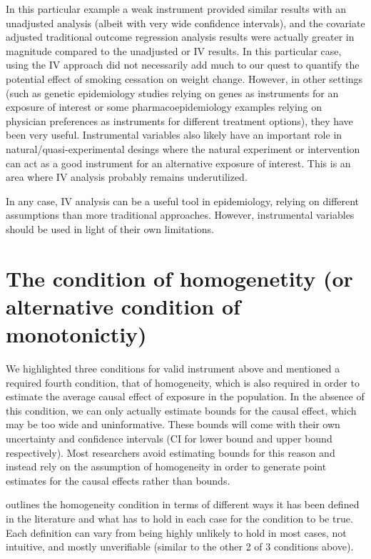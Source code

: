 \documentclass[
]{book}
\begin{document}
In this particular example a weak instrument provided similar results with an unadjusted analysis (albeit with very wide confidence intervals), and the covariate adjusted traditional outcome regression analysis results were actually greater in magnitude compared to the unadjusted or IV results. In this particular case, using the IV approach did not necessarily add much to our quest to quantify the potential effect of smoking cessation on weight change. However, in other settings (such as genetic epidemiology studies relying on genes as instruments for an exposure of interest or some pharmacoepidemiology examples relying on physician preferences as instruments for different treatment options), they have been very useful. Instrumental variables also likely have an important role in natural/quasi-experimental desings where the natural experiment or intervention can act as a good instrument for an alternative exposure of interest. This is an area where IV analysis probably remains underutilized.

In any case, IV analysis can be a useful tool in epidemiology, relying on different assumptions than more traditional approaches. However, instrumental variables should be used in light of their own limitations.

\section{The condition of homogenetity (or alternative condition of monotonictiy)}\label{the-condition-of-homogenetity-or-alternative-condition-of-monotonictiy}

We highlighted three conditions for valid instrument above and mentioned a required fourth condition, that of homogeneity, which is also required in order to estimate the average causal effect of exposure in the population. In the absence of this condition, we can only actually estimate bounds for the causal effect, which may be too wide and uninformative. These bounds will come with their own uncertainty and confidence intervals (CI for lower bound and upper bound respectively). Most researchers avoid estimating bounds for this reason and instead rely on the assumption of homogeneity in order to generate point estimates for the causal effects rather than bounds.

\citet{hernanch16} outlines the homogeneity condition in terms of different ways it has been defined in the literature and what has to hold in each case for the condition to be true. Each definition can vary from being highly unlikely to hold in most cases, not intuitive, and mostly unverifiable (similar to the other 2 of 3 conditions above).
\end{document}

